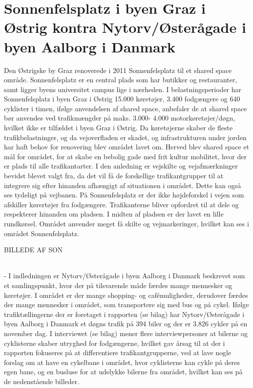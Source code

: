\chapter{Sonnenfelsplatz i byen Graz i Østrig kontra Nytorv/Østerågade i byen Aalborg i Danmark}
\label{chap:sonnenfelsplatz_i_byen_Graz_i_Østrig kontra_nytorv/østerågade_i_byen_aalborg_i_danmark}

Den Østrigske by Graz renoverede i 2011 Sonnenfelsplatz til et shared space område. Sonnenfelsplatz er en central plads som har butikker og restauranter, samt ligger byens universitet campus lige i nærheden. \autocite{ssing2015}
I belastningsperioder har Sonnenfelsplatz i byen Graz i Østrig 15.000 køretøjer, 3.400 fodgængere og 640 cyklister i timen, ifølge anvendelsen af shared space, anbefaler de at shared space bør anvendes ved trafikmængder på maks. 3.000- 4.000 motorkøretøjer/døgn, hvilket ikke er tilfældet i byen Graz i Østrig. \autocite{vejlednigomss2013}
Da køretøjerne skaber de fleste trafikbelastninger, og da vejoverfladen er skadet, og infrastrukturen under jorden har haft behov for renovering blev området lavet om. Herved blev shared space et mål for området, for at skabe en bebolig gade med frit kultur mobilitet, hvor der er plads til alle trafikantarter. I den anledning er vejskilte og vejafmærkninger bevidst blevet valgt fra, da det vil få de forskellige trafikantgrupper til at integrere sig efter hinanden afhængigt af situationen i området. Dette kan også ses tydeligt på vejbanen.
På Sonnenfelsplatz er der ikke højdeforskel i vejen som afskiller kørertøjer fra fodgængere. Trafikanterne bliver opfordret til at dele og respekterer hinanden om pladsen. I midten af pladsen er der lavet en lille rundkørsel. Området anvender meget få skilte og vejmarkeringer, hvilket kan ses i området Sonnenfelsplatz. \autocite{SP2015}

BILLEDE AF SON

\\
-	I indledningen er Nytorv/Østerågade i byen Aalborg i Danmark beskrevet som et samlingspunkt, hvor der på tilsvarende måde færdes mange mennesker og køretøjer. I området er der mange shopping- og cafémuligheder, derudover færdes der mange mennesker i området, som transportere sig med bus og på cykel. Ifølge trafiktællingerne der er foretaget i rapporten (se bilag) har Nytorv/Østerågade i byen Aalborg i Danmark et døgns trafik på 394 biler og der er 3.826 cykler på en november dag. I interviewet (se bilag) mener flere interviewpersoner at bilerne og cyklisterne skaber utryghed for fodgængerne, hvilket gav årsag til at der i rapporten fokuseres på at differentiere trafikantgrupperne, ved at lave nogle forslag om at have en cykelbane i området, hvor cyklisterne kan cykle på deres egen bane, og en busluse for at udelykke bilerne fra området, hvilket kan ses på de nedenstående billeder. 

